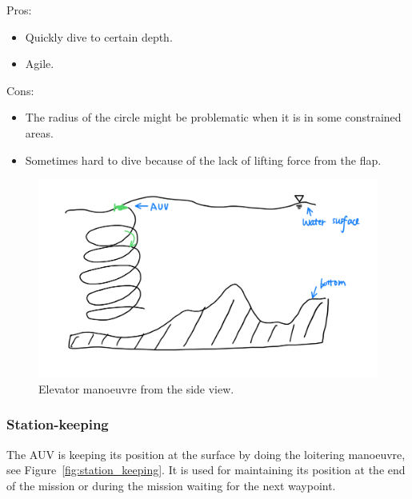 \documentclass[a4paper,12pt]{report}
\begin{document}
Pros:
\begin{itemize}
    \item Quickly dive to certain depth.
    \item Agile.
\end{itemize}
Cons:
\begin{itemize}
    \item The radius of the circle might be problematic when it is in some constrained areas.
    \item Sometimes hard to dive because of the lack of lifting force from the flap.
\end{itemize}

\begin{figure}
    \centering
    \includegraphics[width = \textwidth]{fig/elevator.png}
    \caption{Elevator manoeuvre from the side view.}
    \label{fig:elevator}
\end{figure}

\subsubsection*{Station-keeping}
The AUV is keeping its position at the surface by doing the loitering manoeuvre, see Figure~\ref{fig:station_keeping}. It is used for maintaining its position at the end of the mission or during the mission waiting for the next waypoint.
\end{document}
